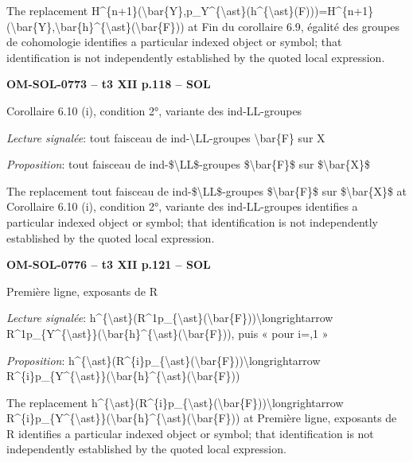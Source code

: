 The replacement H\textasciicircum{}\{n+1\}(\textbackslash{}bar\{Y\},p\_Y\textasciicircum{}\{\textbackslash{}ast\}(h\textasciicircum{}\{\textbackslash{}ast\}(F)))=\allowbreak H\textasciicircum{}\{n+1\}(\textbackslash{}bar\{Y\},\textbackslash{}bar\{h\}\textasciicircum{}\{\textbackslash{}ast\}(\textbackslash{}bar\{F\})) at Fin du corollaire 6.9, égalité des groupes de cohomologie identifies a particular indexed object or symbol; that identification is not independently established by the quoted local expression.\par
\par\noindent\textbf{OM-SOL-0773 -- t3 XII p.118 -- SOL}\par
Corollaire 6.10 (i), condition 2°, variante des ind-LL-groupes\par
\emph{Lecture signalée}: tout faisceau de ind-\textbackslash{}LL-groupes \textbackslash{}bar\{F\} sur X\par
\emph{Proposition}: tout faisceau de ind-\$\textbackslash{}LL\$-groupes \$\textbackslash{}bar\{F\}\$ sur \$\textbackslash{}bar\{X\}\$\par
The replacement tout faisceau de ind-\$\textbackslash{}LL\$-groupes \$\textbackslash{}bar\{F\}\$ sur \$\textbackslash{}bar\{X\}\$ at Corollaire 6.10 (i), condition 2°, variante des ind-LL-groupes identifies a particular indexed object or symbol; that identification is not independently established by the quoted local expression.\par
\par\noindent\textbf{OM-SOL-0776 -- t3 XII p.121 -- SOL}\par
Première ligne, exposants de R\par
\emph{Lecture signalée}: h\textasciicircum{}\{\textbackslash{}ast\}(R\textasciicircum{}1p\_\{\textbackslash{}ast\}(\textbackslash{}bar\{F\}))\textbackslash{}longrightarrow R\textasciicircum{}1p\_\{Y\textasciicircum{}\{\textbackslash{}ast\}\}(\textbackslash{}bar\{h\}\textasciicircum{}\{\textbackslash{}ast\}(\textbackslash{}bar\{F\})), puis « pour i=,1 »\par
\emph{Proposition}: h\textasciicircum{}\{\textbackslash{}ast\}(R\textasciicircum{}\{i\}p\_\{\textbackslash{}ast\}(\textbackslash{}bar\{F\}))\textbackslash{}longrightarrow R\textasciicircum{}\{i\}p\_\{Y\textasciicircum{}\{\textbackslash{}ast\}\}(\textbackslash{}bar\{h\}\textasciicircum{}\{\textbackslash{}ast\}(\textbackslash{}bar\{F\}))\par
The replacement h\textasciicircum{}\{\textbackslash{}ast\}(R\textasciicircum{}\{i\}p\_\{\textbackslash{}ast\}(\textbackslash{}bar\{F\}))\textbackslash{}longrightarrow R\textasciicircum{}\{i\}p\_\{Y\textasciicircum{}\{\textbackslash{}ast\}\}(\textbackslash{}bar\{h\}\textasciicircum{}\{\textbackslash{}ast\}(\textbackslash{}bar\{F\})) at Première ligne, exposants de R identifies a particular indexed object or symbol; that identification is not independently established by the quoted local expression.\par
